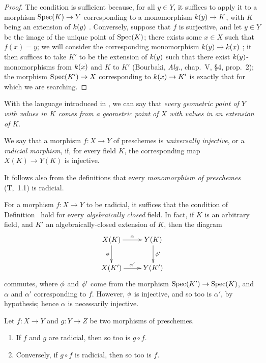 \begin{proof}
\label{proof-prof-1.3.5.3}
The condition is sufficient because, for all $y\in Y$, it suffices to apply it to a morphism $\Spec(K)\to Y$ corresponding to a monomorphism $\kres(y)\to K$, with $K$ being an extension of $k(y)$ .
Conversely, suppose that $f$ is surjective, and let $y\in Y$ be the image of the unique point of ${\mathop{\mathrm{Spec}}\nolimits}(K)$; there exists some $x\in X$ such that $f(x)=y$; we will consider the corresponding monomorphism $\kres(y)\to\kres(x)$ ; it then suffices to take $K'$ to be the extension of $k(y)$ such that there exist $k(y)$-monomorphisms from $k(x)$ and $K$ to $K'$ (Bourbaki, \emph{Alg.}, chap.~V, §4, prop.~2); the morphism $\Spec(K')\to X$ corresponding to $\kres(x)\to K'$ is exactly that for which we are searching.
\end{proof}

With the language introduced in , we can say that \emph{every geometric point of $Y$ with values in $K$ comes from a geometric point of $X$ with values in an extension of $K$}.

\begin{defn}[3.5.4]
\label{1.3.5.4}
We say that a morphism $f:X\to Y$ of preschemes is \emph{universally injective}, or a \emph{radicial morphism}, if, for every field $K$, the corresponding map $X(K)\to Y(K)$ is injective.
\end{defn}

It follows also from the definitions that every \emph{monomorphism of preschemes} (T,~1.1) is radicial.

\begin{env}[3.5.5]
\label{1.3.5.5}
For a morphism $f:X\to Y$ to be radicial, it suffices that the condition of Definition~ hold for every \emph{algebraically closed} field.
In fact, if $K$ is an arbitrary field, and $K'$ an algebraically-closed extension of $K$, then the diagram
\[
  \xymatrix{
    X(K)\ar[r]^\alpha\ar[d]_\vphi &
    Y(K)\ar[d]^{\vphi'}\\
    X(K')\ar[r]^{\alpha'} &
    Y(K')
  }
\]
commutes, where $\phi$ and $\phi'$ come from the morphism $\Spec(K')\to\Spec(K)$, and $\alpha$ and $\alpha'$ corresponding to $f$.
However, $\phi$ is injective, and so too is $\alpha'$, by hypothesis; hence $\alpha$ is necessarily injective.
\end{env}

\begin{prop}[3.5.6]
\label{1.3.5.6}
Let $f:X\to Y$ and $g:Y\to Z$ be two morphisms of preschemes.
\begin{enumerate}[label=\emph{(\roman*)}]
  \item If $f$ and $g$ are radicial, then so too is $g\circ f$.
  \item Conversely, if $g\circ f$ is radicial, then so too is $f$.
\end{enumerate}
\end{prop}

